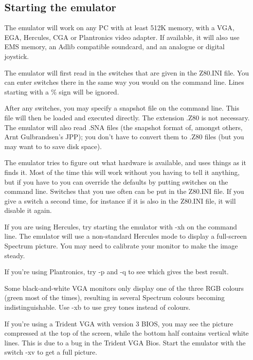 \subsection{Starting the emulator}

    The emulator will work on any PC with at least 512K memory, with a VGA,
    EGA, Hercules, CGA or Plantronics video adapter.  If available, it will
    also use EMS memory, an Adlib compatible soundcard, and an analogue or
    digital joystick.

    The emulator will first read in the switches that are given in the
    Z80.INI file.  You can enter switches there in the same way you would on
    the command line.  Lines starting with a \% sign will be ignored.

    After any switches, you may specify a snapshot file on the command line.
    This file will then be loaded and executed directly.  The extension .Z80
    is not necessary.  The emulator will also read .SNA files (the snapshot
    format of, amongst others, Arnt Gulbrandsen's JPP); you don't have to
    convert them to .Z80 files (but you may want to to save disk space).

    The emulator tries to figure out what hardware is available, and uses
    things as it finds it.  Most of the time this will work without you
    having to tell it anything, but if you have to you can override the
    defaults by putting switches on the command line.  Switches that you use
    often can be put in the Z80.INI file.  If you give a switch a second
    time, for instance if it is also in the Z80.INI file, it will disable it
    again.

    If you are using Hercules, try starting the emulator with -xh on the
    command line.  The emulator will use a non-standard Hercules mode to
    display a full-screen Spectrum picture.  You may need to calibrate your
    monitor to make the image steady.

    If you're using Plantronics, try -p and -q to see which gives the best
    result.

    Some black-and-white VGA monitors only display one of the three RGB
    colours (green most of the times), resulting in several Spectrum colours
    becoming indistinguishable.  Use -xb to use grey tones instead of
    colours.

    If you're using a Trident VGA with version 3 BIOS, you may see the
    picture compressed at the top of the screen, while the bottom half
    contains vertical white lines.  This is due to a bug in the Trident VGA
    Bios.  Start the emulator with the switch -xv to get a full picture.

